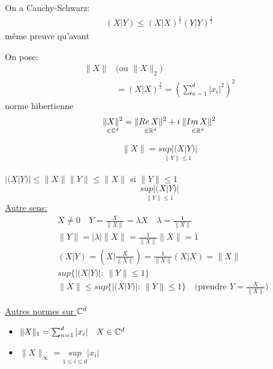 \begin{explanation}
    On a Cauchy-Schwarz:
    \begin{align*}
        (X|Y) \le (X|X)^{\frac{1}{2}}(Y|Y)^{\frac{1}{2}}
    \end{align*}
    même preuve qu'avant
\end{explanation}
On pose:
\begin{align*}
    \|X\| & \text{(ou }\|X\|_2\text{)}\\
          &= (X|X)^{\frac{1}{2}} = \left( \sum_{n=1}^{d} |x_i|^2 \right)^2
\end{align*}
norme hibertienne
\[
    \underset{\in \mathbb{C}^d}{\|X\|^2} = \underset{\in \mathbb{R}^d}{\|Re\,X\|^2} + i\underset{\in \mathbb{R}^d}{\:\|Im\,X\|^2}\\
\] 
\begin{lemma}
   \begin{align*}
       \|X\| = \underset{\|Y\|\le 1}{sup|(X|Y)|}
   \end{align*} 
\end{lemma}
\begin{explanation}
    $|(X|Y)| \le \|X\|\|Y\| \le \|X\|$ si $\|Y\| \le 1$
    \[
    \underset{\|Y\|\le 1}{sup|(X|Y)|}
    \] 
    \underline{Autre sens:} 
    \begin{align*}
        &X \neq 0 \quad Y =  \frac{X}{\|X\|} = \lambda X \quad \lambda = \frac{1}{\|X\|}\\
        &\|Y\| = |\lambda|\|X\| = \frac{1}{\|X\|}\|X\| = 1\\
        &(X|Y) = (X|\frac{X}{\|X\|}) = \frac{1}{\|X\|}(X|X) = \|X\|\\
        &sup \{|(X|Y)|: \, \|Y\| \le  1\}\\
        &\|X\| \le sup \{|(X|Y)|: \, \|Y\|\le 1\} \quad \text{(prendre }Y = \frac{X}{\|X\|}\text{)}
    \end{align*}

\end{explanation}
\underline{Autres normes sur $\mathbb{C}^d$}
\begin{itemize}
    \item $\|X\|_1 = \sum_{n=1}^{d} |x_i| \quad X \in \mathbb{C}^d$
    \item $\|X\|_{\infty} = \underset{1\le i \le d}{sup} |x_i|$
\end{itemize}
